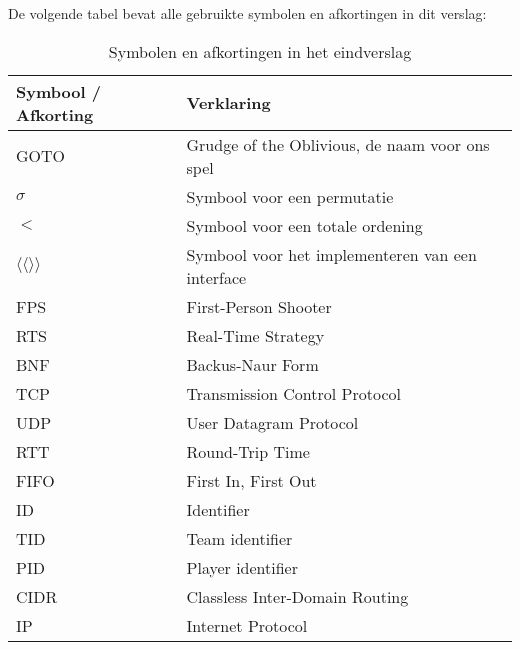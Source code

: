     De volgende tabel bevat alle gebruikte symbolen en afkortingen in dit verslag:
    \begin{table}[H]
        \small
        \centering
        \begin{tabular}{| l | l |}
        \hline
        Symbool / Afkorting & Verklaring \\ \hline
        GOTO & Grudge of the Oblivious, de naam voor ons spel \\ \hline
        $\sigma$ & Symbool voor een permutatie \\ \hline
        $<$ & Symbool voor een totale ordening \\ \hline
        $\langle\langle \rangle\rangle$ & Symbool voor het implementeren van een interface \\ \hline
        FPS & First-Person Shooter \\ \hline
        RTS & Real-Time Strategy \\ \hline
        BNF & Backus-Naur Form \\ \hline
        TCP & Transmission Control Protocol \\ \hline
        UDP & User Datagram Protocol \\ \hline
        RTT & Round-Trip Time \\ \hline
        FIFO & First In, First Out \\ \hline
        ID & Identifier \\ \hline
        TID & Team identifier \\ \hline
        PID & Player identifier \\ \hline
        CIDR & Classless Inter-Domain Routing \\ \hline
        IP & Internet Protocol \\ \hline
        \end{tabular}
        \caption{Symbolen en afkortingen in het eindverslag}
        \label{tab:planning}
    \end{table}